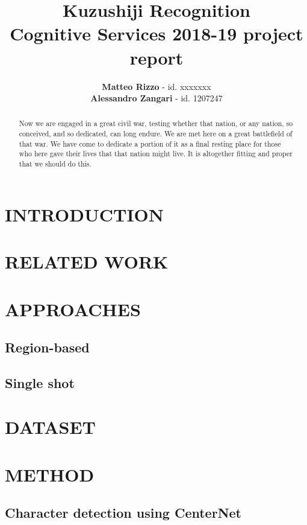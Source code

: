 \documentclass{pasa}%
\title[Kuzushiji Recognition]{Kuzushiji Recognition \\ \large Cognitive Services 2018-19 project report}
\author[Matteo Rizzo, Alessandro Zangari]{\textbf{Matteo Rizzo} - id. xxxxxxx\\ \textbf{Alessandro Zangari} - id. 1207247\\}%
\begin{document}
%
%
\begin{abstract}
Now we are engaged in a great civil war, testing whether that nation, or any nation, so conceived, and so dedicated, can long endure. We are met here on a great battlefield of that war. We have come to dedicate a portion of it as a final resting place for those who here gave their lives that that nation might live. It is altogether fitting and proper that we should do this.
\end{abstract}
%
%
\maketitle%
%
\section{INTRODUCTION}
\label{sec:intro}

\section{RELATED WORK}
\label{sec:relatedwork}

\section{APPROACHES}
\label{sec:approaches}

\subsection{Region-based}
\label{ssec:regionbased}

\subsection{Single shot}
\label{ssec:singleshot}

\section{DATASET}
\label{sec:dataset}

\section{METHOD}
\label{sec:method}

\subsection{Character detection using CenterNet}
\label{ssec:charactercenternet}
\end{document}
